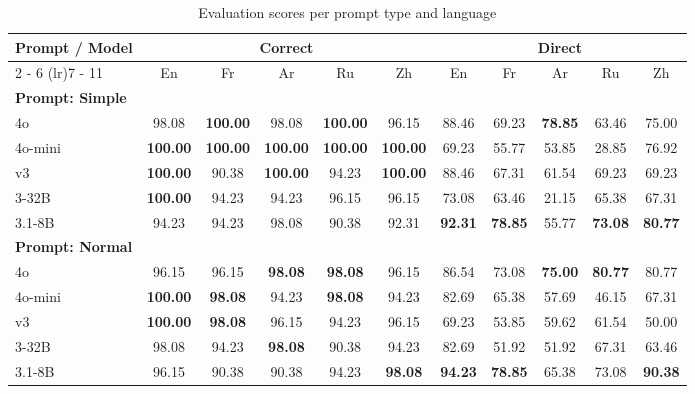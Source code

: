 \documentclass{article}%
\begin{document}
%
\normalsize%


\begin{table}[h!]%
\centering%
\begin{tabular}{@{}lcccccccccc@{}}%
\toprule%
\textbf{Prompt / Model} & \multicolumn{5}{c}{\textbf{Correct}} & \multicolumn{5}{c}{\textbf{Direct}}\\%
\cmidrule(lr){2%
-%
6}%
\cmidrule(lr){7%
-%
11}%
&En&Fr&Ar&Ru&Zh&En&Fr&Ar&Ru&Zh\\%
\midrule%
\multicolumn{11}{l}{\textbf{Prompt: Simple}} \\%
\openai{} 4o&98.08&\textbf{100.00}&98.08&\textbf{100.00}&96.15&88.46&69.23&\textbf{78.85}&63.46&75.00\\%
\openai{} 4o-mini&\textbf{100.00}&\textbf{100.00}&\textbf{100.00}&\textbf{100.00}&\textbf{100.00}&69.23&55.77&53.85&28.85&76.92\\%
\deepseek{} v3&\textbf{100.00}&90.38&\textbf{100.00}&94.23&\textbf{100.00}&88.46&67.31&61.54&69.23&69.23\\%
\qwen{} 3-32B&\textbf{100.00}&94.23&94.23&96.15&96.15&73.08&63.46&21.15&65.38&67.31\\%
\meta{} 3.1-8B&94.23&94.23&98.08&90.38&92.31&\textbf{92.31}&\textbf{78.85}&55.77&\textbf{73.08}&\textbf{80.77}\\%
\midrule%
\multicolumn{11}{l}{\textbf{Prompt: Normal}} \\%
\openai{} 4o&96.15&96.15&\textbf{98.08}&\textbf{98.08}&96.15&86.54&73.08&\textbf{75.00}&\textbf{80.77}&80.77\\%
\openai{} 4o-mini&\textbf{100.00}&\textbf{98.08}&94.23&\textbf{98.08}&94.23&82.69&65.38&57.69&46.15&67.31\\%
\deepseek{} v3&\textbf{100.00}&\textbf{98.08}&96.15&94.23&96.15&69.23&53.85&59.62&61.54&50.00\\%
\qwen{} 3-32B&98.08&94.23&\textbf{98.08}&90.38&94.23&82.69&51.92&51.92&67.31&63.46\\%
\meta{} 3.1-8B&96.15&90.38&90.38&94.23&\textbf{98.08}&\textbf{94.23}&\textbf{78.85}&65.38&73.08&\textbf{90.38}\\\bottomrule%
%
\end{tabular}%
\caption{Evaluation scores per prompt type and language}%
\end{table}

%
\end{document}
